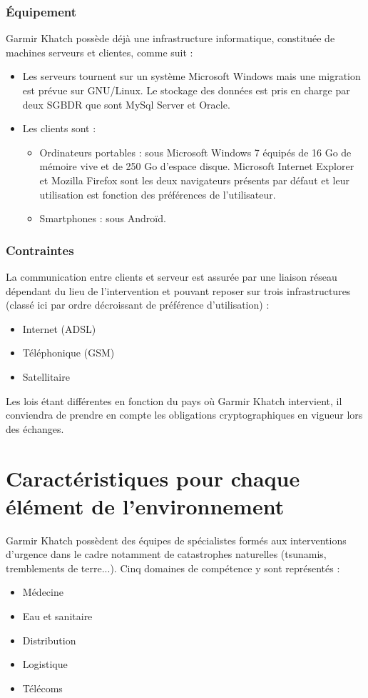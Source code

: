 \subsubsection{Équipement}
Garmir Khatch possède déjà une infrastructure informatique, constituée de machines serveurs et clientes, comme suit :
\begin{itemize}
\item Les serveurs tournent sur un système Microsoft Windows mais une migration est prévue sur GNU/Linux. Le stockage des données est pris en charge par deux SGBDR que sont MySql Server et Oracle.
\item Les clients sont :
\begin{itemize}
\item Ordinateurs portables : sous Microsoft Windows 7 équipés de 16 Go de mémoire vive et de 250 Go d'espace disque. Microsoft Internet Explorer et Mozilla Firefox sont les deux navigateurs présents par défaut et leur utilisation est fonction des préférences de l'utilisateur.
\item Smartphones : sous Androïd.
\end{itemize}
\end{itemize}

\subsubsection{Contraintes}
La communication entre clients et serveur est assurée par une liaison réseau dépendant du lieu de l'intervention et pouvant reposer sur trois infrastructures (classé ici par ordre décroissant de préférence d'utilisation) :
\begin{itemize}
\item Internet (ADSL)
\item Téléphonique (GSM)
\item Satellitaire
\end{itemize}
Les lois étant différentes en fonction du pays où Garmir Khatch intervient, il conviendra de prendre en compte les obligations cryptographiques en vigueur lors des échanges.

\section{Caractéristiques pour chaque élément de l'environnement}
Garmir Khatch possèdent des équipes de spécialistes formés aux interventions d'urgence dans le cadre notamment de catastrophes naturelles (tsunamis, tremblements de terre...).
Cinq domaines de compétence y sont représentés :
\begin{itemize}
\item Médecine
\item Eau et sanitaire
\item Distribution
\item Logistique
\item Télécoms
\end{itemize}

